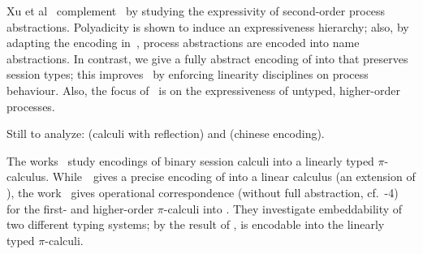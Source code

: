  Xu et al~\cite{DBLP:conf/wsfm/XuYL13} 
complement~\cite{DBLP:conf/icalp/LanesePSS10} 
by studying the expressivity %
of 
second-order process abstractions.
Polyadicity is shown to induce an expressiveness hierarchy; 
also,
by adapting the encoding in~\cite{SangiorgiD:expmpa},
process abstractions are encoded into name abstractions.
In contrast, we 
give a fully abstract encoding of
 \PHOpp into \HO that preserves session types; this improves~\cite{DBLP:conf/icalp/LanesePSS10,DBLP:conf/wsfm/XuYL13}   
by enforcing linearity disciplines on process behaviour.
Also, the focus of~\cite{DBLP:conf/icalp/LanesePSS10,DBLP:conf/wsfm/XuYL13} is on 
the expressiveness of untyped, higher-order processes. %

Still to analyze: \cite{DBLP:journals/entcs/MeredithR05,DBLP:conf/tgc/MeredithR05} (calculi with reflection) and
\cite{DBLP:journals/corr/XuYL15} (chinese encoding).


The works~\cite{DemangeonH11,Dardha:2012:STR:2370776.2370794} 
study encodings of binary session calculi into a linearly typed $\pi$-calculus. 
While~\cite{DemangeonH11}~gives a precise encoding of \sessp into a linear calculus 
(an extension of \cite{BHY}),  
the work~\cite{Dardha:2012:STR:2370776.2370794} 
gives operational correspondence (without full abstraction, cf.~-4)
for the first- and higher-order 
$\pi$-calculi into \cite{LinearPi}. 
They investigate embeddability of two different typing systems;
by the result of \cite{DemangeonH11}, 
\HOpp is encodable  into the linearly typed $\pi$-calculi.     

